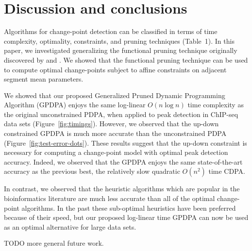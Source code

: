 \documentclass{article}
\begin{document}
%   

\section{Discussion and conclusions}

Algorithms for change-point detection can be classified in terms of
time complexity, optimality, constraints, and pruning techniques
(Table~1). In this paper, we investigated generalizing the functional
pruning technique originally discovered by \citet{pruned-dp} and
\citet{johnson}. We showed that the functional pruning technique can
be used to compute optimal change-points subject to affine constraints
on adjacent segment mean parameters.

We showed that our proposed Generalized Pruned Dynamic Programming
Algorithm (GPDPA) enjoys the same log-linear $O(n\log n)$ time
complexity as the original unconstrained PDPA, when applied to peak
detection in ChIP-seq data sets (Figure~\ref{fig:timings}). However,
we observed that the up-down constrained GPDPA is much more accurate
than the unconstrained PDPA (Figure~\ref{fig:test-error-dots}). These
results suggest that the up-down constraint is necessary for computing
a change-point model with optimal peak detection accuracy. Indeed, we
observed that the GPDPA enjoys the same state-of-the-art accuracy as
the previous best, the relatively slow quadratic $O(n^2)$ time
CDPA.

In contrast, we observed that the heuristic algorithms which are
popular in the bioinformatics literature are much less accurate than
all of the optimal change-point algorithms. In the past these
sub-optimal heuristics have been preferred because of their speed, but
our proposed log-linear time GPDPA can now be used as an optimal
alternative for large data sets.

TODO more general future work.


\newpage

\end{document}
